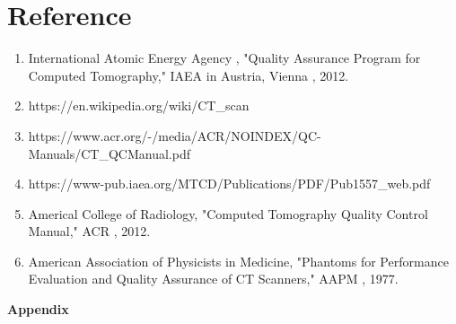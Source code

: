 \documentclass[12pt]{article}
\begin{document}
\section{Reference}
\begin{enumerate}
    \item International Atomic Energy Agency , "Quality Assurance Program for Computed Tomography," IAEA in Austria, Vienna , 2012.
    \item https://en.wikipedia.org/wiki/CT\_scan
    \item https://www.acr.org/-/media/ACR/NOINDEX/QC-Manuals/CT\_QCManual.pdf
    \item https://www-pub.iaea.org/MTCD/Publications/PDF/Pub1557\_web.pdf
    \item Americal College of Radiology, "Computed Tomography Quality Control Manual," ACR , 2012.
    \item American Association of Physicists in Medicine, "Phantoms for Performance Evaluation and Quality Assurance of CT Scanners," AAPM , 1977.
    
\end{enumerate}
\pagebreak
\textbf{\Large{Appendix}}
\begin{appendix}
  \listoffigures
\end{appendix}
\end{document}
